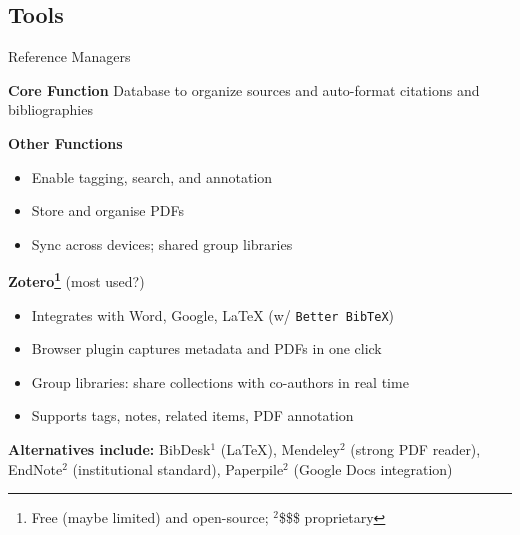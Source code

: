 \documentclass{beamer}
\begin{document}
\subsection{Tools}
\begin{frame}{Reference Managers}

  \footnotesize

  \begin{block}{\textbf{Core Function}}
    Database to organize sources and auto-format citations and bibliographies
  \end{block}
  \textbf{Other Functions}
  \begin{itemize}\scriptsize
    \item Enable tagging, search, and annotation
    \item Store and organise PDFs
    \item Sync across devices; shared group libraries
  \end{itemize}

  \medskip
  \textbf{Zotero\footnote{{\tiny Free (maybe limited) and open-source; $\phantom{}^2$\$\$\$ proprietary}}} (most used?)
  \begin{itemize}
     \item Integrates with Word, Google, \LaTeX{}
      (w/ \texttt{Better BibTeX})
    \item Browser plugin captures
      metadata and PDFs in one click
    \item Group libraries: share collections with
      co-authors in real time
    \item Supports tags, notes, related items, PDF annotation
  \end{itemize}

  \medskip
  \scriptsize
  \textbf{Alternatives include:} 
  BibDesk$\phantom{}^1$ (\LaTeX), 
  Mendeley$\phantom{}^2$ (strong PDF reader),
  EndNote$\phantom{}^2$ (institutional standard), 
  Paperpile$\phantom{}^2$ (Google Docs integration)

\end{frame}


\end{document}
